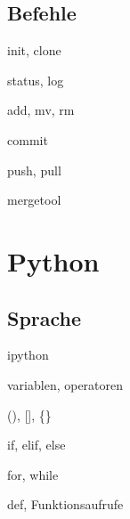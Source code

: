\documentclass[t]{beamer}
\begin{document}
    \subsection{Befehle}
      \begin{frame}{init, clone}
      \end{frame}

      \begin{frame}{status, log}
      \end{frame}

      \begin{frame}{add, mv, rm}
      \end{frame}
      
      \begin{frame}{commit}
      \end{frame}
      
      \begin{frame}{push, pull}
      \end{frame}
      
      \begin{frame}{mergetool}
      \end{frame}

  \section{Python}
    \subsection{Sprache}
      \begin{frame}{ipython}
      \end{frame}
      
      \begin{frame}{variablen, operatoren}
      \end{frame}
      
      \begin{frame}{(), [], \{\}}
      \end{frame}
      
      \begin{frame}{if, elif, else}
      \end{frame}
      
      \begin{frame}{for, while}
      \end{frame}
      
      \begin{frame}{def, Funktionsaufrufe}
      \end{frame}
      
\end{document}
